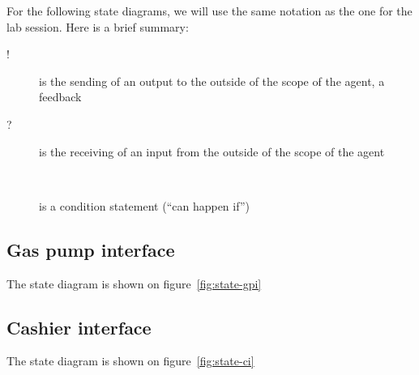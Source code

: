 For the following state diagrams, we will use the same notation as
the one for the lab session. Here is a brief summary:

\begin{description}
    \item[!] is the sending of an output to the outside of the scope of the agent,
    a feedback
    \item[?] is the receiving of an input from the outside of the scope of the agent
    \item[\lbrack{}\ \rbrack{} ] is a condition statement (\enquote{can happen if})
\end{description}

\subsection{Gas pump interface}

The state diagram is shown on figure~\ref{fig:state-gpi}

\subsection{Cashier interface}

The state diagram is shown on figure~\ref{fig:state-ci}



